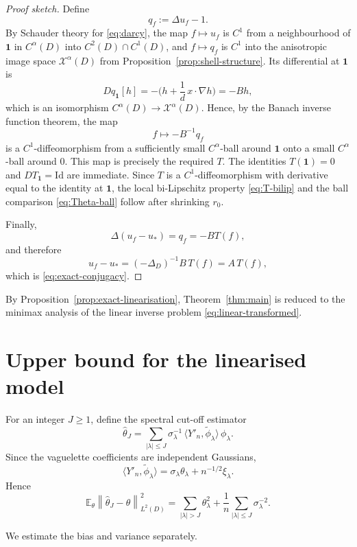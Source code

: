 \documentclass[11pt]{article}
\newcommand{\E}{\mathbb E}
\newcommand{\1}{\mathbf 1}
\newcommand{\la}{\langle}
\newcommand{\ra}{\rangle}
\newcommand{\norm}[1]{\left\|#1\right\|}
\begin{document}
\begin{proof}[Proof sketch]
Define
\[
q_f:=\Delta u_f-1.
\]
By Schauder theory for \eqref{eq:darcy}, the map $f\mapsto u_f$ is $C^1$ from a neighbourhood of $\1$ in $C^\alpha(D)$ into $C^{2}(D)\cap C^1(D)$, and $f\mapsto q_f$ is $C^1$ into the anisotropic image space $\mathcal X^\alpha(D)$ from Proposition~\ref{prop:shell-structure}. Its differential at $\1$ is
\[
Dq_{\1}[h]
=
-\Big(h+\frac1d\,x\cdot\nabla h\Big)
=
-Bh,
\]
which is an isomorphism $C^\alpha(D)\to \mathcal X^\alpha(D)$. Hence, by the Banach inverse function theorem, the map
\[
f\longmapsto -B^{-1}q_f
\]
is a $C^1$-diffeomorphism from a sufficiently small $C^\alpha$-ball around $\1$ onto a small $C^\alpha$-ball around $0$. This map is precisely the required $T$. The identities $T(\1)=0$ and $DT_{\1}=\mathrm{Id}$ are immediate. Since $T$ is a $C^1$-diffeomorphism with derivative equal to the identity at $\1$, the local bi-Lipschitz property \eqref{eq:T-bilip} and the ball comparison \eqref{eq:Theta-ball} follow after shrinking $r_0$.

Finally,
\[
\Delta(u_f-u_\ast)=q_f=-BT(f),
\]
and therefore
\[
u_f-u_\ast=(-\Delta_D)^{-1}B\,T(f)=A\,T(f),
\]
which is \eqref{eq:exact-conjugacy}.
\end{proof}

By Proposition~\ref{prop:exact-linearisation}, Theorem~\ref{thm:main} is reduced to the minimax analysis of the linear inverse problem \eqref{eq:linear-transformed}.

\section{Upper bound for the linearised model}

For an integer $J\ge1$, define the spectral cut-off estimator
\begin{equation}\label{eq:theta-hat}
\widehat\theta_J
=
\sum_{|\lambda|\le J}
\sigma_\lambda^{-1}\,\la Y'_n,\widetilde\phi_\lambda\ra\,\phi_\lambda.
\end{equation}
Since the vaguelette coefficients are independent Gaussians,
\[
\la Y'_n,\widetilde\phi_\lambda\ra
=
\sigma_\lambda\theta_\lambda+n^{-1/2}\xi_\lambda.
\]
Hence
\begin{equation}\label{eq:risk-decomp}
\E_\theta\norm{\widehat\theta_J-\theta}_{L^2(D)}^2
=
\sum_{|\lambda|>J}\theta_\lambda^2
+
\frac1n\sum_{|\lambda|\le J}\sigma_\lambda^{-2}.
\end{equation}

We estimate the bias and variance separately.
\end{document}
